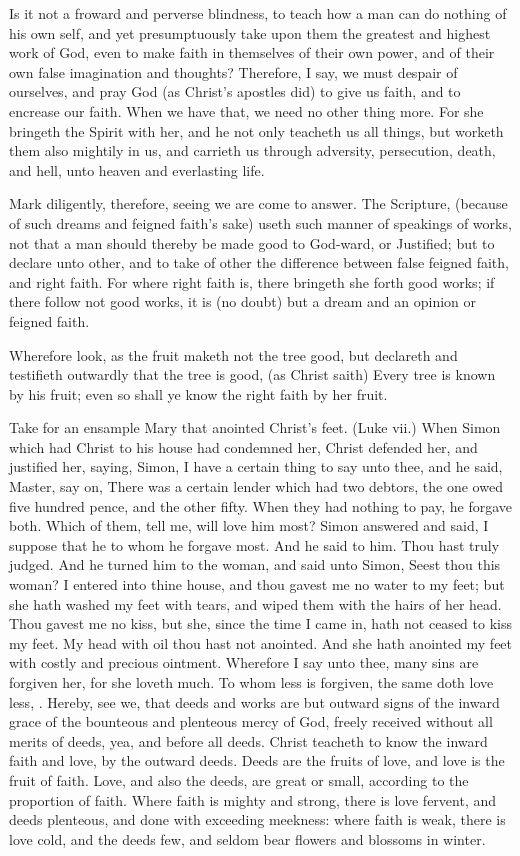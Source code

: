 \documentclass{article}
\begin{document}
Is it not a froward and perverse blindness, to teach how 
a man can do nothing of his own self, and yet
presumptuously take upon them the greatest and highest work of 
God, even to make faith in themselves of their own power, 
and of their own false imagination and thoughts?
Therefore, I say, we must despair of ourselves, and pray God 
(as Christ's apostles did) to give us faith, and to encrease 
our faith. When we have that, we need no other thing 
more. For she bringeth the Spirit with her, and he not 
only teacheth us all things, but worketh them also mightily 
in us, and carrieth us through adversity, persecution, death, 
and hell, unto heaven and everlasting life. 


Mark diligently, therefore, seeing we are come to
answer. The Scripture, (because of such dreams and feigned 
faith's sake) useth such manner of speakings of works, 
not that a man should thereby be made good to God-ward, 
or Justified; but to declare unto other, and to take of 
other the difference between false feigned faith, and right 
faith. For where right faith is, there bringeth she forth 
good works; if there follow not good works, it is (no 
doubt) but a dream and an opinion or feigned faith. 

Wherefore look, as the fruit maketh not the tree good, 
but declareth and testifieth outwardly that the tree is good, 
(as Christ saith) Every tree is known by his fruit; even 
so shall ye know the right faith by her fruit. 

Take for an ensample Mary that anointed Christ's feet. 
(Luke vii.) When Simon which had Christ to his house 
had condemned her, Christ defended her, and justified her, 
saying, Simon, I have a certain thing to say unto thee, and 
he said, Master, say on, There was a certain lender which 
had two debtors, the one owed five hundred pence, and 
the other fifty. When they had nothing to pay, he forgave 
both. Which of them, tell me, will love him most?
Simon answered and said, I suppose that he to whom he
forgave most. And he said to him. Thou hast truly judged. 
And he turned him to the woman, and said unto Simon, 
Seest thou this woman? I entered into thine house, and 
thou gavest me no water to my feet; but she hath washed 
my feet with tears, and wiped them with the hairs of her 
head. Thou gavest me no kiss, but she, since the time I 
came in, hath not ceased to kiss my feet. My head with
oil thou hast not anointed. And she hath anointed my feet
with costly and precious ointment. Wherefore I say unto 
thee, many sins are forgiven her, for she loveth much. To 
whom less is forgiven, the same doth love less, \ampc. 
Hereby, see we, that deeds and works are but outward 
signs of the inward grace of the bounteous and plenteous 
mercy of God, freely received without all merits of deeds, 
yea, and before all deeds. Christ teacheth to know the 
inward faith and love, by the outward deeds. Deeds are the 
fruits of love, and love is the fruit of faith. Love, and 
also the deeds, are great or small, according to the
proportion of faith. Where faith is mighty and strong, there 
is love fervent, and deeds plenteous, and done with
exceeding meekness: where faith is weak, there is love cold, 
and the deeds few, and seldom bear flowers and blossoms 
in winter. 
\end{document}
